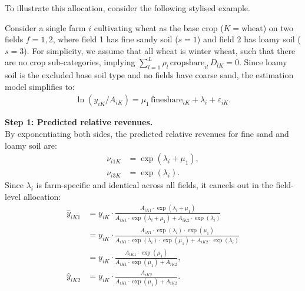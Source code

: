 \documentclass[12pt]{article}
\begin{document}
To illustrate this allocation, consider the following stylised example.
\begin{tcolorbox}[
  colback=gray!10,
  colframe=gray!50!black,
  title=Example: Estimating Field-Level Outputs,
  fonttitle=\bfseries,
  arc=2mm,
  breakable
]
Consider a single farm $i$ cultivating wheat as the base crop ($K = \text{wheat}$)
on two fields $f = 1, 2$, where field 1 has fine sandy soil ($s = 1$) and field 2
has loamy soil ($s = 3$).
For simplicity, we assume that all wheat is winter wheat, such that there are no
crop sub-categories, implying $\sum_{l=1}^{L} \rho_l\,\text{cropshare}_{il}\,D_{lK} = 0$.
Since loamy soil is the excluded base soil type and no fields have coarse sand,
the estimation model simplifies to:
\begin{align*}
    \ln(y_{iK}/A_{iK}) = \mu_1\,\text{fineshare}_{iK}
    + \lambda_i + \varepsilon_{iK}.
\end{align*}

\medskip
\noindent\textbf{Step 1: Predicted relative revenues.}\\
By exponentiating both sides, the predicted relative revenues for fine sand and
loamy soil are:
\begin{align*}
    \nu_{i1K} & = \exp(\lambda_i + \mu_1), \\
    \nu_{i3K} & = \exp(\lambda_i).
\end{align*}
Since $\lambda_i$ is farm-specific and identical across all fields, it cancels
out in the field-level allocation:
\begin{align*}
    \hat{y}_{iK1}
    & = y_{iK} \cdot \frac{A_{iK1} \cdot \exp(\lambda_i + \mu_1)}
    {A_{iK1} \cdot \exp(\lambda_i + \mu_1) + A_{iK2} \cdot \exp(\lambda_i)} \\[0.5cm]
    & = y_{iK} \cdot \frac{A_{iK1} \cdot \exp(\lambda_i) \cdot \exp(\mu_1)}
    {A_{iK1} \cdot \exp(\lambda_i) \cdot \exp(\mu_1) + A_{iK2} \cdot \exp(\lambda_i)} \\[0.5cm]
    & = y_{iK} \cdot \frac{A_{iK1} \cdot \exp(\mu_1)}
    {A_{iK1} \cdot \exp(\mu_1) + A_{iK2}}, \\[0.5cm]
    \hat{y}_{iK2} & = y_{iK} \cdot \frac{A_{iK2}}
    {A_{iK1} \cdot \exp(\mu_1) + A_{iK2}}.
\end{align*}


\end{tcolorbox}
\end{document}
